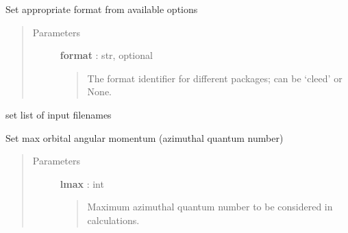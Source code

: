 \documentclass[letterpaper,10pt,english]{sphinxmanual}
\begin{document}
\begin{fulllineitems}
\begin{fulllineitems}
\label{modules:phaseshifts.conphas.Conphas.set_format}
Set appropriate format from available options
\begin{quote}\begin{description}
\item[{Parameters}] \leavevmode
\textbf{format} : str, optional
\begin{quote}

The format identifier for different packages; can be `cleed'
or None.
\end{quote}

\end{description}\end{quote}

\end{fulllineitems}


\begin{fulllineitems}
\label{modules:phaseshifts.conphas.Conphas.set_input_files}
set list of input filenames

\end{fulllineitems}


\begin{fulllineitems}
\label{modules:phaseshifts.conphas.Conphas.set_lmax}
Set max orbital angular momentum (azimuthal quantum number)
\begin{quote}\begin{description}
\item[{Parameters}] \leavevmode
\textbf{lmax} : int
\begin{quote}

Maximum azimuthal quantum number to be considered in calculations.
\end{quote}

\end{description}\end{quote}

\end{fulllineitems}



\end{fulllineitems}
\end{document}

